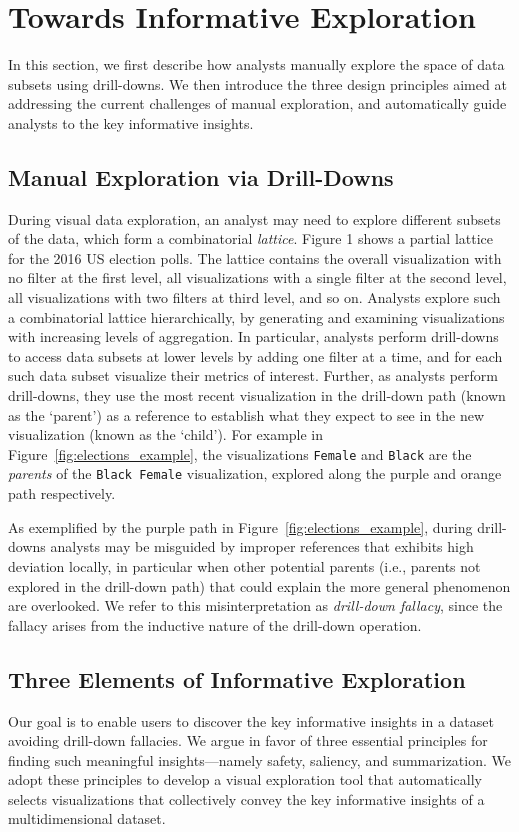
\section{Towards Informative Exploration}
In this section, we first describe how analysts manually explore the space of data subsets using drill-downs. We then introduce the three design principles aimed at addressing the current challenges of manual exploration, and automatically guide analysts to the key informative insights. 

\subsection{Manual Exploration via Drill-Downs}
During visual data exploration, an analyst may need to explore different subsets of the data, which form a combinatorial \emph{lattice}. Figure 1 shows a partial lattice for the 2016 US election polls. The lattice contains the overall visualization with no filter at the first level, all visualizations with a single filter at the second level, all visualizations with two filters at third level, and so on. Analysts explore such a combinatorial lattice hierarchically, by generating and examining visualizations with increasing levels of aggregation. In particular, analysts perform drill-downs to access data subsets at lower levels by adding one filter at a time, and for each such data subset visualize their metrics of interest. Further, as analysts perform drill-downs, they use the most recent visualization in the drill-down path (known as the `parent') as a reference to establish what they expect to see in the new visualization (known as the `child'). For example in Figure~\ref{fig:elections_example}, the visualizations \texttt{Female} and \texttt{Black} are the \emph{parents} of the \texttt{Black Female} visualization, explored along the purple and orange path respectively.
\par As exemplified by the purple path in Figure~\ref{fig:elections_example}, during drill-downs analysts may be misguided by improper references that exhibits high deviation locally, in particular when other potential parents (i.e., parents not explored in the drill-down path) that could explain the more general phenomenon are overlooked. We refer to this misinterpretation as \emph{drill-down fallacy}, since the fallacy arises from the inductive nature of the drill-down operation. 

\subsection{Three Elements of Informative Exploration}
Our goal is to enable users to discover the key informative insights in a dataset avoiding drill-down fallacies. We argue in favor of three essential principles for finding such meaningful insights---namely safety, saliency, and summarization. We adopt these principles to develop a visual exploration tool that automatically selects visualizations that collectively convey the key informative insights of a multidimensional dataset.

